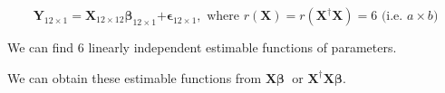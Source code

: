 \documentclass{article}
\begin{document}
\begin{equation*}
\mathbf{Y}_{12\times 1}\mathbf{=X}_{12\times 12}\mathbf{\beta }_{12\times 1}%
\mathbf{+\epsilon }_{12\times 1},\text{ where }r\left( \mathbf{X}\right)
=r\left( \mathbf{X}^{\dagger }\mathbf{X}\right) =6\text{ (i.e. }a\times b%
\text{)}
\end{equation*}

We can find 6 linearly independent estimable functions of parameters.

We can obtain these estimable functions from $\mathbf{X\beta }$\textbf{\ }or 
$\mathbf{X}^{\dagger }\mathbf{X\beta }$.
\end{document}
